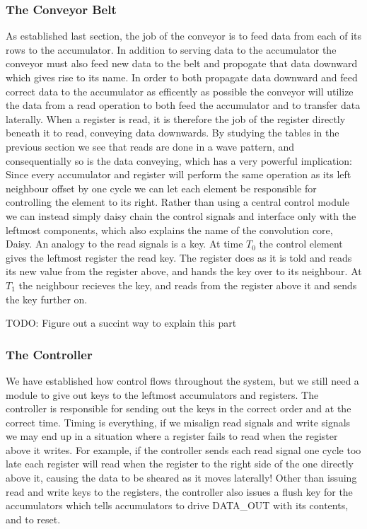 \begin{Description}
\subsubsection{The Conveyor Belt}
As established last section, the job of the conveyor is to feed data from each of its rows to the accumulator.
In addition to serving data to the accumulator the conveyor must also feed new data to the belt and propogate that data downward which gives rise to its name.
In order to both propagate data downward and feed correct data to the accumulator as efficently as possible the conveyor will utilize the data from a read operation to both feed the accumulator and to transfer data laterally.
When a register is read, it is therefore the job of the register directly beneath it to read, conveying data downwards.
By studying the tables in the previous section we see that reads are done in a wave pattern, and consequentially so is the data conveying, which has a very powerful implication:
Since every accumulator and register will perform the same operation as its left neighbour offset by one cycle we can let each element be responsible for controlling the element to its right.
Rather than using a central control module we can instead simply daisy chain the control signals and interface only with the leftmost components, which also explains the name of the convolution core, Daisy.
An analogy to the read signals is a key. At time $T_{0}$ the control element gives the leftmost register the read key. 
The register does as it is told and reads its new value from the register above, and hands the key over to its neighbour. 
At $T_{1}$ the neighbour recieves the key, and reads from the register above it and sends the key further on.

TODO: Figure out a succint way to explain this part

\subsubsection{The Controller}
We have established how control flows throughout the system, but we still need a module to give out keys to the leftmost accumulators and registers.
The controller is responsible for sending out the keys in the correct order and at the correct time.
Timing is everything, if we misalign read signals and write signals we may end up in a situation where a register fails to read when the register above it writes.
For example, if the controller sends each read signal one cycle too late each register will read when the register to the right side of the one directly above it, causing the data to be sheared as it moves laterally!
Other than issuing read and write keys to the registers, the controller also issues a flush key for the accumulators which tells accumulators to drive DATA\_OUT with its contents, and to reset.


\end{Description}
